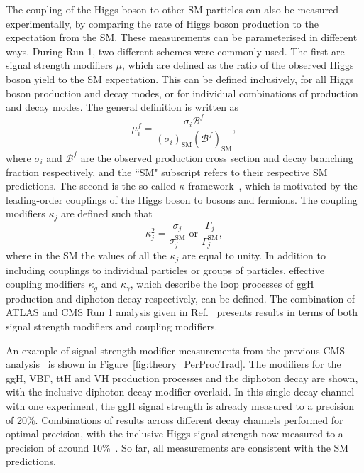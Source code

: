 The coupling of the Higgs boson to other SM particles can also be measured experimentally, 
by comparing the rate of Higgs boson production to the expectation from the SM.
These measurements can be parameterised in different ways.
During Run 1, two different schemes were commonly used.
The first are signal strength modifiers $\mu$, 
which are defined as the ratio of the observed Higgs boson yield to the SM expectation.
This can be defined inclusively, for all Higgs boson production and decay modes, 
or for individual combinations of production and decay modes.
The general definition is written as
\begin{equation}
\mu^f_i = \frac{\sigma_i\mathcal{B}^f}{(\sigma_i)_{\textrm{SM}}(\mathcal{B}^f)_{\textrm{SM}}} ,
\end{equation}
where $\sigma_i$ and $\mathcal{B}^f$ are the observed production cross section 
and decay branching fraction respectively, 
and the ``SM" subscript refers to their respective SM predictions.
The second is the so-called $\kappa$-framework~\cite{YR3}, 
which is motivated by the leading-order couplings of the Higgs boson to bosons and fermions.
The coupling modifiers $\kappa_j$ are defined such that 
\begin{equation}
\kappa^2_j = \frac{\sigma_j}{\sigma_j^{\textrm{SM}}} \; \mathrm{or} \; \frac{\Gamma_j}{\Gamma_j^{\textrm{SM}}} ,
\end{equation}
where in the SM the values of all the $\kappa_j$ are equal to unity.
In addition to including couplings to individual particles or groups of particles, 
effective coupling modifiers $\kappa_g$ and $\kappa_\gamma$, 
which describe the loop processes of ggH production and diphoton decay respectively, can be defined.
The combination of ATLAS and CMS Run 1 analysis given in Ref.~\cite{ATLASandCMScouplingsRun1} 
presents results in terms of both signal strength modifiers and coupling modifiers.

An example of signal strength modifier measurements 
from the previous CMS \Hgg analysis~\cite{HIG-16-040} is shown in Figure~\ref{fig:theory_PerProcTrad}.
The modifiers for the ggH, VBF, ttH and VH production processes and the diphoton decay are shown, 
with the inclusive diphoton decay modifier overlaid.
In this single decay channel with one experiment, 
the ggH signal strength is already measured to a precision of 20\%.
Combinations of results across different decay channels performed for optimal precision,
with the inclusive Higgs signal strength now measured 
to a precision of around 10\%~\cite{ATLAScomb,CMScomb}.
So far, all measurements are consistent with the SM predictions.

